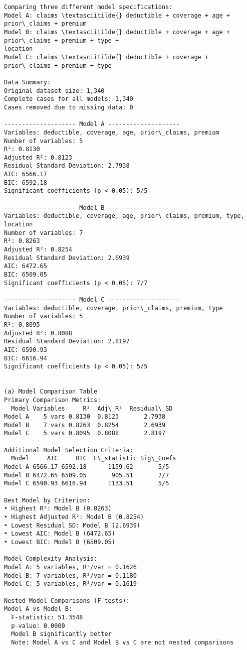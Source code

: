 \documentclass[8pt, twocolumn]{extarticle}
\begin{document}
    \begin{Verbatim}[commandchars=\\\{\}]
Comparing three different model specifications:
Model A: claims \textasciitilde{} deductible + coverage + age + prior\_claims + premium
Model B: claims \textasciitilde{} deductible + coverage + age + prior\_claims + premium + type +
location
Model C: claims \textasciitilde{} deductible + coverage + prior\_claims + premium + type

Data Summary:
Original dataset size: 1,340
Complete cases for all models: 1,340
Cases removed due to missing data: 0

-------------------- Model A --------------------
Variables: deductible, coverage, age, prior\_claims, premium
Number of variables: 5
R²: 0.8130
Adjusted R²: 0.8123
Residual Standard Deviation: 2.7938
AIC: 6566.17
BIC: 6592.18
Significant coefficients (p < 0.05): 5/5

-------------------- Model B --------------------
Variables: deductible, coverage, age, prior\_claims, premium, type, location
Number of variables: 7
R²: 0.8263
Adjusted R²: 0.8254
Residual Standard Deviation: 2.6939
AIC: 6472.65
BIC: 6509.05
Significant coefficients (p < 0.05): 7/7

-------------------- Model C --------------------
Variables: deductible, coverage, prior\_claims, premium, type
Number of variables: 5
R²: 0.8095
Adjusted R²: 0.8088
Residual Standard Deviation: 2.8197
AIC: 6590.93
BIC: 6616.94
Significant coefficients (p < 0.05): 5/5


(a) Model Comparison Table
Primary Comparison Metrics:
  Model Variables     R²  Adj\_R²  Residual\_SD
Model A    5 vars 0.8130  0.8123       2.7938
Model B    7 vars 0.8263  0.8254       2.6939
Model C    5 vars 0.8095  0.8088       2.8197

Additional Model Selection Criteria:
  Model     AIC     BIC  F\_statistic Sig\_Coefs
Model A 6566.17 6592.18      1159.62       5/5
Model B 6472.65 6509.05       905.51       7/7
Model C 6590.93 6616.94      1133.51       5/5

Best Model by Criterion:
• Highest R²: Model B (0.8263)
• Highest Adjusted R²: Model B (0.8254)
• Lowest Residual SD: Model B (2.6939)
• Lowest AIC: Model B (6472.65)
• Lowest BIC: Model B (6509.05)

Model Complexity Analysis:
Model A: 5 variables, R²/var = 0.1626
Model B: 7 variables, R²/var = 0.1180
Model C: 5 variables, R²/var = 0.1619

Nested Model Comparisons (F-tests):
Model A vs Model B:
  F-statistic: 51.3548
  p-value: 0.0000
  Model B significantly better
  Note: Model A vs C and Model B vs C are not nested comparisons
    \end{Verbatim}
\end{document}
